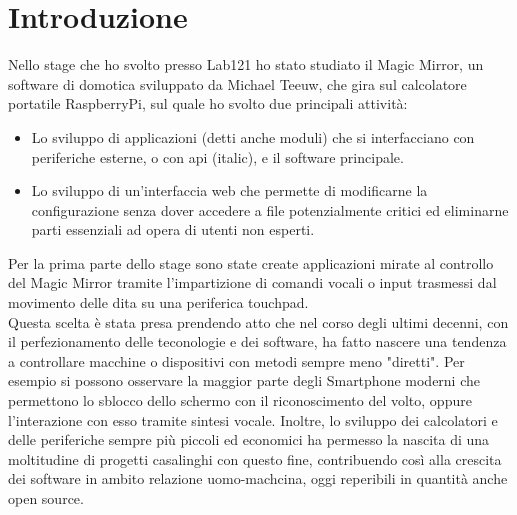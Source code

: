\chapter*{Introduzione}

Nello stage che ho svolto presso Lab121 ho stato studiato il Magic Mirror, un software di domotica sviluppato da Michael Teeuw,
che gira sul calcolatore portatile RaspberryPi\cite{Raspberry}, sul quale ho svolto due principali attivit\`a:\\
\begin{itemize}
\item Lo sviluppo di applicazioni (detti anche moduli) che si interfacciano con periferiche esterne, o con api (italic), e il software
principale.
\item Lo sviluppo di un'interfaccia web che permette di modificarne la configurazione senza dover accedere
a file potenzialmente critici ed eliminarne parti essenziali ad opera di utenti non esperti.\\[1\baselineskip]
\end{itemize}
Per la prima parte dello stage sono state create applicazioni mirate al controllo del
Magic Mirror tramite l'impartizione di comandi vocali o input trasmessi dal movimento delle dita su
una periferica touchpad.\\
Questa scelta \`e stata presa prendendo atto che nel corso
degli ultimi decenni, con il perfezionamento delle teconologie e dei software, ha fatto nascere
una tendenza a controllare macchine o dispositivi con metodi sempre meno "diretti".
Per esempio si possono osservare la maggior parte degli Smartphone moderni che permettono lo sblocco dello schermo con
il riconoscimento del volto, oppure l'interazione con esso tramite sintesi vocale.
Inoltre, lo sviluppo dei calcolatori e delle periferiche sempre pi\`u piccoli ed economici ha permesso
la nascita di una moltitudine di progetti casalinghi con questo fine, contribuendo così
alla crescita dei software in ambito relazione uomo-machcina, oggi reperibili in quantità anche open source.
\\[2\baselineskip]
